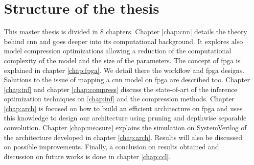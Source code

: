 \section*{Structure of the thesis}
This master thesis is divided in 8 chapters. \newline \newline
%
Chapter \ref{chap:cnn} details the theory behind \acrshort{cnn} and goes deeper into its computational background. It explores also model compression optimizations allowing a reduction of the computational complexity of the model and the size of the parameters. \newline \newline
%
The concept of \acrshort{fpga} is explained in chapter \ref{chap:fpga}. We detail there the workflow and \acrshort{fpga} designs. Solutions to the issue of mapping a \acrshort{cnn} model on \acrshort{fpga} are described too. \newline \newline
%
Chapter \ref{chap:inf} and chapter \ref{chap:compress} discuss the state-of-art of the inference optimization techniques on \ref{chap:inf} and the compression methods.\newline \newline
%
Chapter \ref{chap:arch} is focused on how to build an efficient architecture on \acrshort{fpga} and uses this knowledge to design our architecture using pruning and depthwise separable convolution.\newline \newline
%
Chapter \ref{chap:measure} explains the simulation on SystemVerilog of the architecture developed in chapter \ref{chap:arch}. Results will also be discussed on possible improvements.\newline \newline
%
Finally, a conclusion on results obtained and discussion on future works is done in chapter \ref{chap:ccl}.
\afterpage{\blankpage}
\cleardoublepage
\newpage
